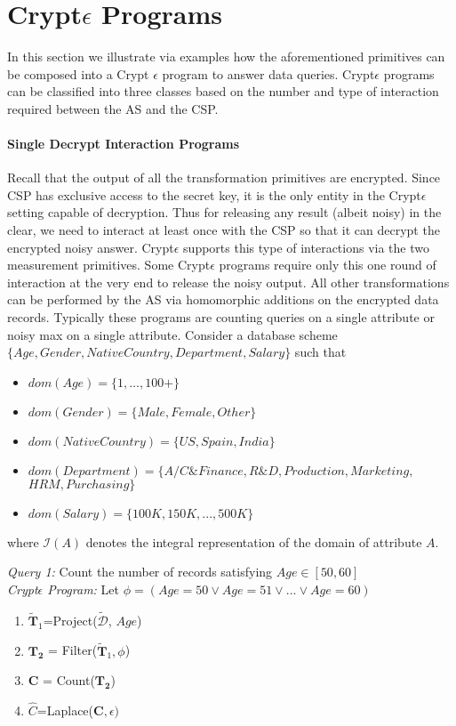 \section{Crypt$\epsilon$ Programs}\label{program}
In this section we illustrate via examples how the aforementioned primitives can be composed into a Crypt $\epsilon$ program to answer data queries.
Crypt$\epsilon$ programs can be classified into three classes based on the number and type of interaction required between the AS and the CSP.
\paragraph{\textbf{Single Decrypt Interaction Programs}}
Recall that the output of all the transformation primitives are encrypted.  Since CSP has exclusive access to the secret key, it is the only entity in the Crypt$\epsilon$ setting capable of decryption. Thus for releasing any result (albeit noisy) in the clear, we need to interact at least once with the CSP so that it can decrypt the encrypted noisy answer. Crypt$\epsilon$ supports this type of interactions via the two measurement primitives. Some Crypt$\epsilon$ programs require only this one round of interaction at the very end to release the noisy output. All other transformations can be performed by the AS via homomorphic additions on the encrypted data records. Typically these programs are counting queries on a single attribute or noisy max on a single attribute. 
Consider a database scheme $\{Age, Gender, NativeCountry, Department, Salary\}$ such that \begin{itemize}\item $dom(Age)=\{1,\ldots,100+\}$  \item $dom(Gender)=\{Male, Female, Other\}$\item $dom(NativeCountry)=\{US,Spain,India\}$ \item $dom(Department)=\{A/C \& Finance, R\&D, Production, Marketing,$\\ $HRM, Purchasing \}$ \item $dom(Salary)=\{100K,150K,...,500K\}$ \end{itemize} where $\mathcal{I}(A)$ denotes the integral representation of the domain of attribute $A$.
\begin{exmp}
\textit{Query 1:} Count the number of records satisfying $Age \in [50,60]$\\
\textit{Crypt$\epsilon$ Program:}
Let $\phi=(Age=50 \vee Age=51 \vee ... \vee Age=60)$ 
\begin{enumerate} \item $\mathbf{\tilde{T}}_1$=Project($\boldsymbol{\tilde{\mathcal{D}}}$, $Age$)  \item  $\mathbf{T_2}$ = Filter($\mathbf{\tilde{T}}_1,\phi$)\item $\mathbf{C}$ = Count($\mathbf{T_2}$) \item $\hat{C}$=Laplace($\mathbf{C},\epsilon)$\end{enumerate}
\end{exmp}


